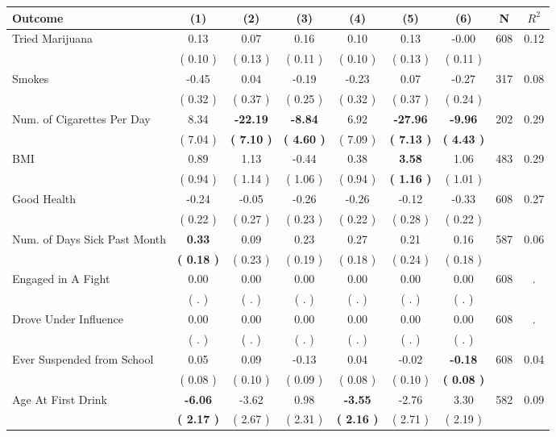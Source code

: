 \begin{tabular}{lcccccccc}
\toprule
 \textbf{Outcome} & \textbf{(1)} & \textbf{(2)} & \textbf{(3)} & \textbf{(4)} & \textbf{(5)} & \textbf{(6)} & \textbf{N} & \textbf{$ R^2$} \\
\midrule
Tried Marijuana &      0.13 &      0.07 &      0.16 &      0.10 &      0.13 &     -0.00 & 608 &       0.12 \\ 
 & (     0.10 ) & (     0.13 ) & (     0.11 ) & (     0.10 ) & (     0.13 ) & (     0.11 ) & \\
Smokes &     -0.45 &      0.04 &     -0.19 &     -0.23 &      0.07 &     -0.27 & 317 &       0.08 \\ 
 & (     0.32 ) & (     0.37 ) & (     0.25 ) & (     0.32 ) & (     0.37 ) & (     0.24 ) & \\
Num. of Cigarettes Per Day &      8.34 & \textbf{   -22.19} & \textbf{    -8.84} &      6.92 & \textbf{   -27.96} & \textbf{    -9.96} & 202 &       0.29 \\ 
 & (     7.04 ) & \textbf{(     7.10 )} & \textbf{(     4.60 )} & (     7.09 ) & \textbf{(     7.13 )} & \textbf{(     4.43 )} & \\
BMI &      0.89 &      1.13 &     -0.44 &      0.38 & \textbf{     3.58} &      1.06 & 483 &       0.29 \\ 
 & (     0.94 ) & (     1.14 ) & (     1.06 ) & (     0.94 ) & \textbf{(     1.16 )} & (     1.01 ) & \\
Good Health &     -0.24 &     -0.05 &     -0.26 &     -0.26 &     -0.12 &     -0.33 & 608 &       0.27 \\ 
 & (     0.22 ) & (     0.27 ) & (     0.23 ) & (     0.22 ) & (     0.28 ) & (     0.22 ) & \\
Num. of Days Sick Past Month & \textbf{     0.33} &      0.09 &      0.23 &      0.27 &      0.21 &      0.16 & 587 &       0.06 \\ 
 & \textbf{(     0.18 )} & (     0.23 ) & (     0.19 ) & (     0.18 ) & (     0.24 ) & (     0.18 ) & \\
Engaged in A Fight &      0.00 &      0.00 &      0.00 &      0.00 &      0.00 &      0.00 & 608 &          . \\ 
 & (        . ) & (        . ) & (        . ) & (        . ) & (        . ) & (        . ) & \\
Drove Under Influence &      0.00 &      0.00 &      0.00 &      0.00 &      0.00 &      0.00 & 608 &          . \\ 
 & (        . ) & (        . ) & (        . ) & (        . ) & (        . ) & (        . ) & \\
Ever Suspended from School &      0.05 &      0.09 &     -0.13 &      0.04 &     -0.02 & \textbf{    -0.18} & 608 &       0.04 \\ 
 & (     0.08 ) & (     0.10 ) & (     0.09 ) & (     0.08 ) & (     0.10 ) & \textbf{(     0.08 )} & \\
Age At First Drink & \textbf{    -6.06} &     -3.62 &      0.98 & \textbf{    -3.55} &     -2.76 &      3.30 & 582 &       0.09 \\ 
 & \textbf{(     2.17 )} & (     2.67 ) & (     2.31 ) & \textbf{(     2.16 )} & (     2.71 ) & (     2.19 ) & \\
\bottomrule
\end{tabular}
